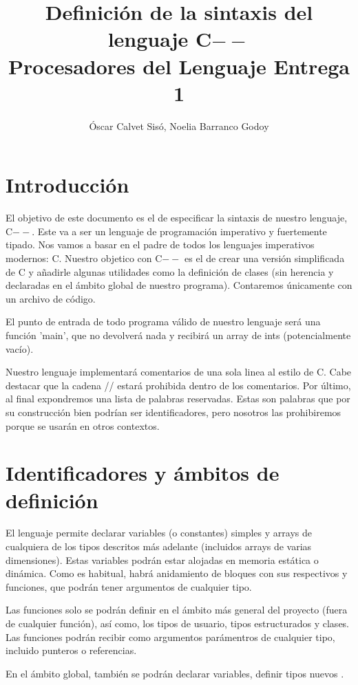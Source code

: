 \documentclass{article}
\title{%
  Definición de la sintaxis del lenguaje C$--$ \\
  \large Procesadores del Lenguaje Entrega 1}
\author{Óscar Calvet Sisó, Noelia Barranco Godoy}
\date{}
\begin{document}
\maketitle

\section{Introducción}
El objetivo de este documento es el de especificar la sintaxis de nuestro lenguaje, C$--$. Este va a ser un lenguaje de programación imperativo y fuertemente tipado. Nos vamos a basar en el padre de todos los lenguajes imperativos modernos: C. Nuestro objetico con C$--$ es el de crear una versión simplificada de C y añadirle algunas utilidades como la definición de clases (sin herencia y declaradas en el ámbito global de nuestro programa). Contaremos únicamente con un archivo de código.

\noindent El punto de entrada de todo programa válido de nuestro lenguaje será una función 'main', que no devolverá nada y recibirá un array de ints (potencialmente vacío).

\noindent Nuestro lenguaje implementará comentarios de una sola linea al estilo de C. Cabe destacar que la cadena // estará prohibida dentro de los comentarios. Por último, al final expondremos una lista de palabras reservadas. Estas son palabras que por su construcción bien podrían ser identificadores, pero nosotros las prohibiremos porque se usarán en otros contextos.

\section{Identificadores y ámbitos de definición}
El lenguaje permite declarar variables (o constantes) simples y arrays de cualquiera de los tipos descritos más adelante (incluidos arrays de varias dimensiones). Estas variables podrán estar alojadas en memoria estática o dinámica. Como es habitual, habrá anidamiento de bloques con sus respectivos y funciones, que podrán tener argumentos de cualquier tipo.

\noindent Las funciones solo se podrán definir en el ámbito más general del proyecto (fuera de cualquier función), así como, los tipos de usuario, tipos estructurados y clases. Las funciones podrán recibir como argumentos parámentros de cualquier tipo, incluido punteros o referencias.

\noindent En el ámbito global, también se podrán declarar variables, definir tipos nuevos .
\end{document}
